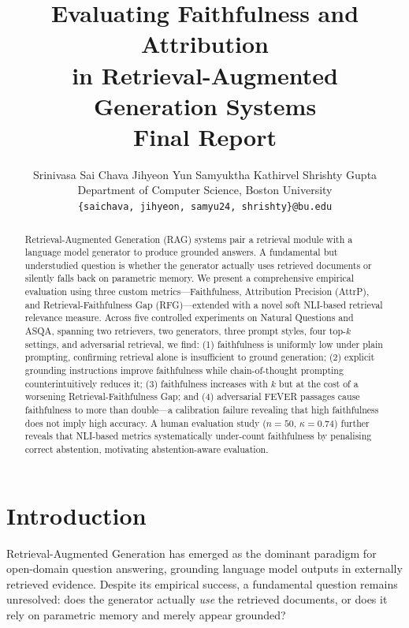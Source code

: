 \documentclass[11pt]{article}
\title{Evaluating Faithfulness and Attribution\\
in Retrieval-Augmented Generation Systems\\
\large Final Report}
\author{
  Srinivasa Sai Chava \quad Jihyeon Yun \quad Samyuktha Kathirvel \quad Shrishty Gupta \\
  Department of Computer Science, Boston University \\
  \texttt{\{saichava, jihyeon, samyu24, shrishty\}@bu.edu}
}
\begin{document}
\maketitle

\begin{abstract}
Retrieval-Augmented Generation (RAG) systems pair a retrieval module with
a language model generator to produce grounded answers.
A fundamental but understudied question is whether the generator actually
uses retrieved documents or silently falls back on parametric memory.
We present a comprehensive empirical evaluation using three custom
metrics---Faithfulness, Attribution Precision (AttrP), and
Retrieval-Faithfulness Gap (RFG)---extended with a novel soft NLI-based
retrieval relevance measure.
Across five controlled experiments on Natural Questions and ASQA,
spanning two retrievers, two generators, three prompt styles,
four top-$k$ settings, and adversarial retrieval, we find:
(1) faithfulness is uniformly low under plain prompting, confirming
retrieval alone is insufficient to ground generation;
(2) explicit grounding instructions improve faithfulness while
chain-of-thought prompting counterintuitively reduces it;
(3) faithfulness increases with $k$ but at the cost of a worsening
Retrieval-Faithfulness Gap;
and (4) adversarial FEVER passages cause faithfulness to more than
double---a calibration failure revealing that high faithfulness does
not imply high accuracy.
A human evaluation study ($n{=}50$, $\kappa{=}0.74$) further reveals
that NLI-based metrics systematically under-count faithfulness by
penalising correct abstention, motivating abstention-aware evaluation.
\end{abstract}

\section{Introduction}

Retrieval-Augmented Generation \cite{NEURIPS2020_6b493230} has emerged as
the dominant paradigm for open-domain question answering, grounding
language model outputs in externally retrieved evidence.
Despite its empirical success, a fundamental question remains unresolved:
does the generator actually \emph{use} the retrieved documents, or does it
rely on parametric memory and merely appear grounded?
\end{document}
